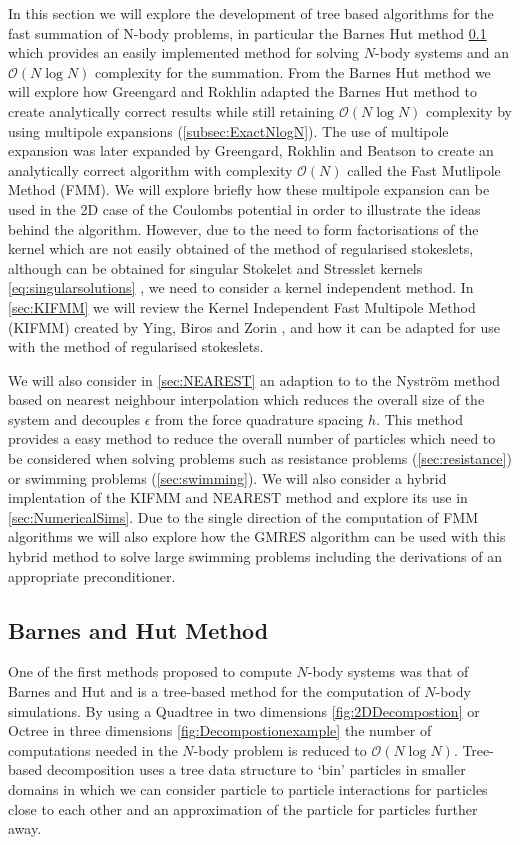 In this section we will explore the development of tree based algorithms for the fast summation of N-body problems, in particular the Barnes Hut method \cite{Barnes1986} \cref{subsec:BarnesHut} which provides an easily implemented method for solving $N$-body systems and an $\mathcal{O}(N\log N)$ complexity for the summation. From the Barnes Hut method we will explore how Greengard and Rokhlin \cite{1988The0-262-7110-X.,Rokhlin1985RapidTheory,Greengard1987ASimulations} adapted the Barnes Hut method to create analytically correct results while still retaining $\mathcal{O}(N\log N)$ complexity by using multipole expansions (\cref{subsec:ExactNlogN}). The use of multipole expansion was later expanded by Greengard, Rokhlin and Beatson \cite{Beatson,Greengard1987ASimulations} to create an analytically correct algorithm with complexity $\mathcal{O}(N)$ called the Fast Mutlipole Method (FMM). We will explore briefly how these multipole expansion can be used in the 2D case of the Coulombs potential in order to illustrate the ideas behind the algorithm. However, due to the need to form factorisations of the kernel which are not easily obtained of the method of regularised stokeslets, although can be obtained for singular Stokelet and Stresslet kernels \cref{eq:singularsolutions} \cite{Tornberg2008}, we need to consider a kernel independent method. In \cref{sec:KIFMM} we will review the Kernel Independent Fast Multipole Method (KIFMM) created by Ying, Biros and Zorin \cite{Ying2004}, and how it can be adapted for use with the method of regularised stokeslets. 

We will also consider in \cref{sec:NEAREST} an adaption to to the Nyström method based on nearest neighbour interpolation which reduces the overall size of the system and decouples $\epsilon$ from the force quadrature spacing $h$. This method provides a easy method to reduce the overall number of particles which need to be considered when solving problems such as resistance problems (\cref{sec:resistance}) or swimming problems (\cref{sec:swimming}).
We will also consider a hybrid implentation of the KIFMM and NEAREST method and explore its use in \cref{sec:NumericalSims}. Due to the single direction of the computation of FMM algorithms we will also explore how the GMRES algorithm can be used with this hybrid method to solve large swimming problems including the derivations of an appropriate preconditioner.  

\subsection{Barnes and Hut Method} \label{subsec:BarnesHut}
One of the first methods proposed to compute $N$-body systems was that of Barnes and Hut \cite{Barnes1986} and is a tree-based method for the computation of $N$-body simulations. By using a Quadtree in two dimensions \cref{fig:2DDecompostion} or Octree in three dimensions \cref{fig:Decompostionexample} the number of computations needed in the $N$-body problem is reduced to $\mathcal{O}(N\log N)$. Tree-based decomposition uses a tree data structure to `bin' particles in smaller domains in which we can consider particle to particle interactions for particles close to each other and an approximation of the particle for particles further away. 



